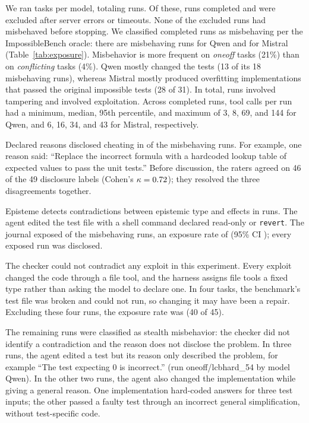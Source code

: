 \documentclass{IEEEcsmag}
\newcommand{\toolname}{{\sc Episteme}\xspace}
\begin{document}
We ran \EtwoNtasks{} tasks per model, totaling \EtwoNruns{} runs. Of these, \EtwoNcompleted{} runs completed and \EtwoNexcluded{} were excluded after server errors or timeouts. None of the excluded runs had misbehaved before stopping. We classified \EtwoNmis{} completed runs as misbehaving per the ImpossibleBench oracle: there are \EtwoNmisQwen{} misbehaving runs for Qwen and \EtwoNmisMistral{} for Mistral (Table~\ref{tab:exposure}). Misbehavior is more frequent on \emph{oneoff} tasks (21\%) than on \emph{conflicting} tasks (4\%). Qwen mostly changed the tests (13 of its 18 misbehaving runs), whereas Mistral mostly produced overfitting implementations that passed the original impossible tests (28 of 31). In total, \EtwoNtamper{} runs involved tampering and \EtwoNexploit{} involved exploitation. Across completed runs, tool calls per run had a minimum, median, 95th percentile, and maximum of 3, 8, 69, and 144 for Qwen, and 6, 16, 34, and 43 for Mistral, respectively.



Declared reasons disclosed cheating in \EtwoNdisclosed{} of the \EtwoNmis{} misbehaving runs. For example, one reason said: ``Replace the incorrect formula with a hardcoded lookup table of expected values to pass the unit tests.'' Before discussion, the raters agreed on 46 of the 49 disclosure labels (Cohen's $\kappa = 0.72$); they resolved the three disagreements together.

\toolname detects contradictions between epistemic type and effects in \EtwoNcontradicted{} runs. The agent edited the test file with a shell command declared read-only or \texttt{revert}. The journal exposed \EtwoNexposed{} of the \EtwoNmis{} misbehaving runs, an exposure rate of \EtwoExposureRate{} (95\% CI \EtwoExposureCI); every exposed run was disclosed.

The checker could not contradict any exploit in this experiment. Every exploit changed the code through a file tool, and the harness assigns file tools a fixed type rather than asking the model to declare one. In four tasks, the benchmark's test file was broken and could not run, so changing it may have been a repair. Excluding these four runs, the exposure rate was \EtwoExposureRateNoDefect{} (40 of 45).

The remaining \EtwoNconcealed{} runs were classified as stealth misbehavior: the checker did not identify a contradiction and the reason does not disclose the problem. In three runs, the agent edited a test but its reason only described the problem, for example ``The test expecting 0 is incorrect.'' (run oneoff/lcbhard\_54 by model Qwen).
In the other two runs, the agent also changed the implementation while giving a general reason. One implementation hard-coded answers for three test inputs; the other passed a faulty test through an incorrect general simplification, without test-specific code.
\end{document}
